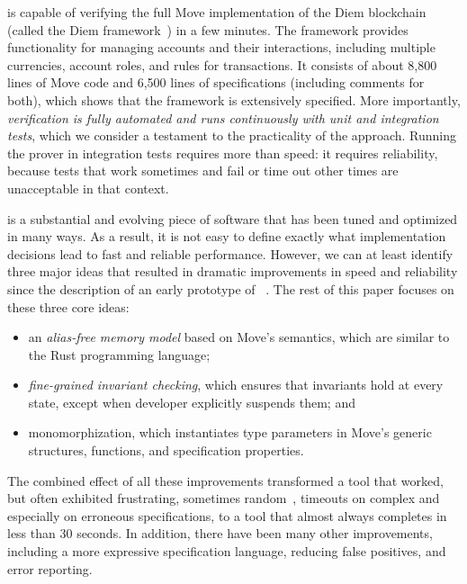 
\MVP is capable of verifying the full
Move implementation of the Diem blockchain
(called the Diem framework~\cite{DIEM_FRAMEWORK})
in a few minutes.
%
The framework provides functionality for managing
accounts and their interactions, including multiple currencies, account roles,
and rules for transactions.
%
It consists of
about 8,800 lines of Move code and
6,500 lines of specifications (including comments for both),
which shows that the framework is extensively specified.
More importantly,
\emph{verification is fully automated and runs continuously with unit and integration
  tests},
which we consider a testament to the practicality of the approach.
%
Running the prover in integration tests requires more than speed:
it requires reliability,
because tests that work sometimes and fail or time out other times
are unacceptable in that context.

\MVP is a substantial and evolving piece of software that has
been tuned and optimized in many ways.
As a result, it is not easy to define exactly what implementation decisions
lead to fast and reliable performance.
%
However, we can at least identify three major ideas that
resulted in dramatic improvements in speed and reliability since the
description of an early prototype of \MVP~\cite{MOVE_PROVER}.
%
The rest of this paper focuses on these three core ideas:
\begin{itemize}
\item an \emph{alias-free memory model} based on Move's semantics, which are similar to the Rust programming language;
\item \emph{fine-grained invariant checking}, which ensures that invariants hold at every state, except when developer explicitly suspends them; and
\item monomorphization, which instantiates type parameters in Move's generic structures, functions, and specification properties.
\end{itemize}
The combined effect of all these improvements transformed a tool that worked, but
often exhibited frustrating, sometimes random~\cite{BUTTERFLY},
timeouts on complex and especially
on erroneous specifications, to a tool that almost always completes in less than 30 seconds.
In addition, there have been many other improvements, including
a more expressive specification language,
reducing false positives,
and error reporting.


